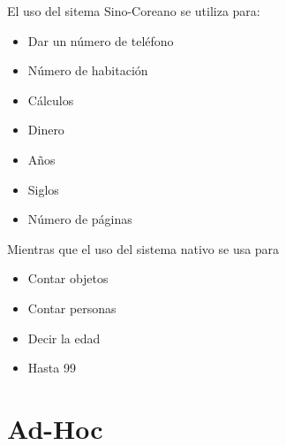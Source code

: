 El uso del sitema Sino-Coreano se utiliza para:

\begin{itemize}
	\item Dar un número de teléfono
	\item Número de habitación
	\item Cálculos
	\item Dinero
	\item Años
	\item Siglos
	\item Número de páginas
\end{itemize}

Mientras que el uso del sistema nativo se usa para

\begin{itemize}
	\item Contar objetos
	\item Contar personas
	\item Decir la edad
	\item Hasta 99
\end{itemize}






\section{Ad-Hoc}

